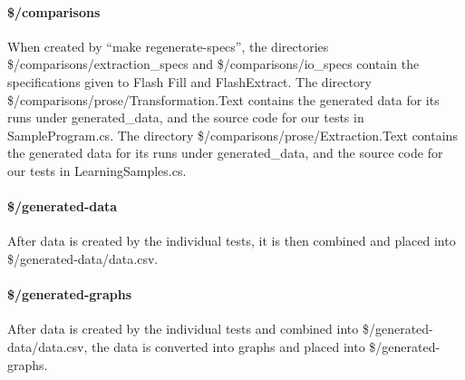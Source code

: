 \documentclass[sigplan,acmsmall]{acmart}
\begin{document}
\paragraph*{\$/comparisons}  When created by ``make regenerate-specs'', the
directories \$/comparisons/extraction\_specs and \$/comparisons/io\_specs
contain the specifications given to Flash Fill and FlashExtract.  The directory
\$/comparisons/prose/Transformation.Text contains the generated data for its
runs under generated\_data, and the source code for our tests in
SampleProgram.cs.  The directory
\$/comparisons/prose/Extraction.Text contains the generated data for its
runs under generated\_data, and the source code for our tests in
LearningSamples.cs.

\paragraph*{\$/generated-data}  After data is created by the individual tests,
it is then combined and placed into \$/generated-data/data.csv.

\paragraph*{\$/generated-graphs}  After data is created by the individual tests
and combined into \$/generated-data/data.csv, the data is converted into graphs
and placed into \$/generated-graphs.
\end{document}
